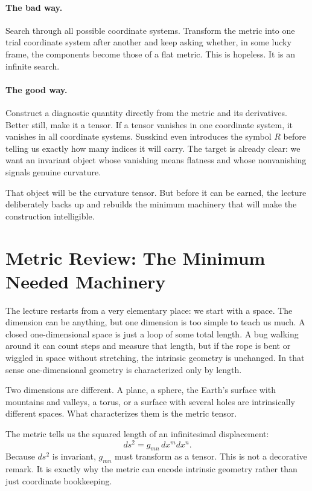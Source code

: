 \paragraph{The bad way.} Search through all possible coordinate systems. Transform the metric into one trial coordinate system after another and keep asking whether, in some lucky frame, the components become those of a flat metric. This is hopeless. It is an infinite search.

\paragraph{The good way.} Construct a diagnostic quantity directly from the metric and its derivatives. Better still, make it a tensor. If a tensor vanishes in one coordinate system, it vanishes in all coordinate systems. Susskind even introduces the symbol \(R\) before telling us exactly how many indices it will carry. The target is already clear: we want an invariant object whose vanishing means flatness and whose nonvanishing signals genuine curvature.

That object will be the curvature tensor. But before it can be earned, the lecture deliberately backs up and rebuilds the minimum machinery that will make the construction intelligible.

\section{Metric Review: The Minimum Needed Machinery}

The lecture restarts from a very elementary place: we start with a space. The dimension can be anything, but one dimension is too simple to teach us much. A closed one-dimensional space is just a loop of some total length. A bug walking around it can count steps and measure that length, but if the rope is bent or wiggled in space without stretching, the intrinsic geometry is unchanged. In that sense one-dimensional geometry is characterized only by length.

Two dimensions are different. A plane, a sphere, the Earth's surface with mountains and valleys, a torus, or a surface with several holes are intrinsically different spaces. What characterizes them is the metric tensor.

The metric tells us the squared length of an infinitesimal displacement:
\begin{equation}
ds^2 = g_{mn}\,dx^m dx^n.
\end{equation}
Because \(ds^2\) is invariant, \(g_{mn}\) must transform as a tensor. This is not a decorative remark. It is exactly why the metric can encode intrinsic geometry rather than just coordinate bookkeeping.

